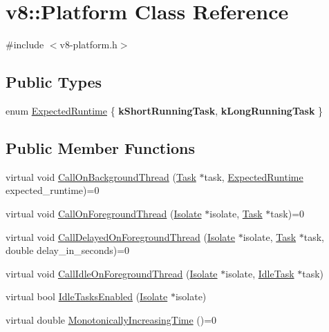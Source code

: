 \hypertarget{classv8_1_1Platform}{}\section{v8\+:\+:Platform Class Reference}
\label{classv8_1_1Platform}


{\ttfamily \#include $<$v8-\/platform.\+h$>$}

\subsection*{Public Types}
\begin{DoxyCompactItemize}
\item 
enum \hyperlink{classv8_1_1Platform_ace7f666b2b5995bb0e898e12fa660718}{Expected\+Runtime} \{ {\bfseries k\+Short\+Running\+Task}, 
{\bfseries k\+Long\+Running\+Task}
 \}
\end{DoxyCompactItemize}
\subsection*{Public Member Functions}
\begin{DoxyCompactItemize}
\item 
virtual void \hyperlink{classv8_1_1Platform_aa715e6839c1954b4e23b9d2df00bd3ea}{Call\+On\+Background\+Thread} (\hyperlink{classv8_1_1Task}{Task} $\ast$task, \hyperlink{classv8_1_1Platform_ace7f666b2b5995bb0e898e12fa660718}{Expected\+Runtime} expected\+\_\+runtime)=0
\item 
virtual void \hyperlink{classv8_1_1Platform_a8fa13959f919d1d3ff170bceea939915}{Call\+On\+Foreground\+Thread} (\hyperlink{classv8_1_1Isolate}{Isolate} $\ast$isolate, \hyperlink{classv8_1_1Task}{Task} $\ast$task)=0
\item 
virtual void \hyperlink{classv8_1_1Platform_a72bff12d95fbf2118279b0e8f53f8a4b}{Call\+Delayed\+On\+Foreground\+Thread} (\hyperlink{classv8_1_1Isolate}{Isolate} $\ast$isolate, \hyperlink{classv8_1_1Task}{Task} $\ast$task, double delay\+\_\+in\+\_\+seconds)=0
\item 
virtual void \hyperlink{classv8_1_1Platform_ae495999016432391f04d323452084b12}{Call\+Idle\+On\+Foreground\+Thread} (\hyperlink{classv8_1_1Isolate}{Isolate} $\ast$isolate, \hyperlink{classv8_1_1IdleTask}{Idle\+Task} $\ast$task)
\item 
virtual bool \hyperlink{classv8_1_1Platform_ad229642bf16a066d2e8d866dc128141e}{Idle\+Tasks\+Enabled} (\hyperlink{classv8_1_1Isolate}{Isolate} $\ast$isolate)
\item 
virtual double \hyperlink{classv8_1_1Platform_a6d4d7c2dcf6b0c7113099b97fa7f57b7}{Monotonically\+Increasing\+Time} ()=0
\end{DoxyCompactItemize}


